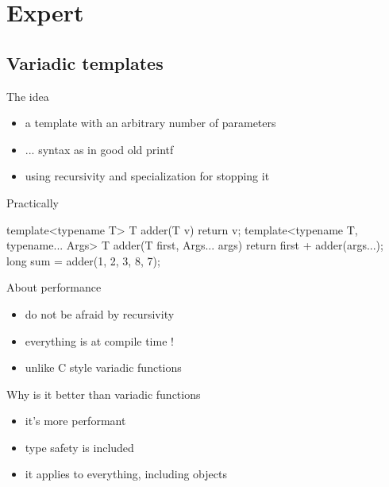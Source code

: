 \section[exp]{Expert \cpp}

\subsection[tmpl]{Variadic templates}


\begin{frame}[fragile]
  \begin{block}{The idea}
    \begin{itemize}
    \item a template with an arbitrary number of parameters
    \item ... syntax as in good old printf
    \item using recursivity and specialization for stopping it
    \end{itemize}
  \end{block}
  \begin{exampleblock}{Practically}
    \begin{cppcode*}{}
      template<typename T>
      T adder(T v) {
        return v;
      }
      template<typename T, typename... Args>
      T adder(T first, Args... args) {
        return first + adder(args...);
      }
      long sum = adder(1, 2, 3, 8, 7);
    \end{cppcode*}
  \end{exampleblock}
\end{frame}

\begin{frame}
  \begin{block}{About performance}
    \begin{itemize}
    \item do not be afraid by recursivity
    \item everything is at compile time !
    \item unlike C style variadic functions
    \end{itemize}
  \end{block}
  \begin{block}{Why is it better than variadic functions}
    \begin{itemize}
    \item it's more performant
    \item type safety is included
    \item it applies to everything, including objects
    \end{itemize}    
  \end{block}
\end{frame}
  
